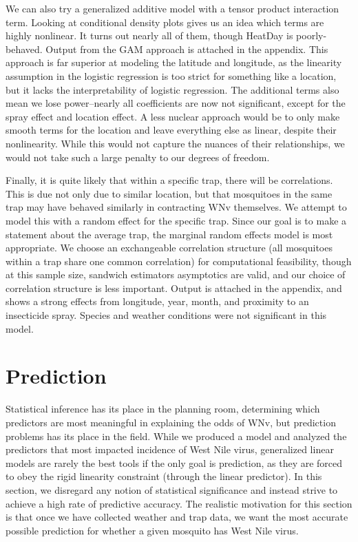 \documentclass[12pt]{article}
\begin{document}
We can also try a generalized additive model with a tensor product interaction term. Looking at conditional density plots gives us an idea which terms are highly nonlinear. It turns out nearly all of them, though HeatDay is poorly-behaved. Output from the GAM approach is attached in the appendix. This approach is far superior at modeling the latitude and longitude, as the linearity assumption in the logistic regression is too strict for something like a location, but it lacks the interpretability of logistic regression. The additional terms also mean we lose power--nearly all coefficients are now not significant, except for the spray effect and location effect. A less nuclear approach would be to only make smooth terms for the location and leave everything else as linear, despite their nonlinearity. While this would not capture the nuances of their relationships, we would not take such a large penalty to our degrees of freedom.

Finally, it is quite likely that within a specific trap, there will be correlations. This is due not only due to similar location, but that mosquitoes in the same trap may have behaved similarly in contracting WNv themselves. We attempt to model this with a random effect for the specific trap. Since our goal is to make a statement about the average trap, the marginal random effects model is most appropriate. We choose an exchangeable correlation structure (all mosquitoes within a trap share one common correlation) for computational feasibility, though at this sample size, sandwich estimators asymptotics are valid, and our choice of correlation structure is less important. Output is attached in the appendix, and shows a strong effects from longitude, year, month, and proximity to an insecticide spray. Species and weather conditions were not significant in this model.

\section{Prediction}
Statistical inference has its place in the planning room, determining which predictors are most meaningful in explaining the odds of WNv, but prediction problems has its place in the field. While we produced a model and analyzed the predictors that most impacted incidence of West Nile virus, generalized linear models are rarely the best tools if the only goal is prediction, as they are forced to obey the rigid linearity constraint (through the linear predictor). In this section, we disregard any notion of statistical significance and instead strive to achieve a high rate of predictive accuracy. The realistic motivation for this section is that once we have collected weather and trap data, we want the most accurate possible prediction for whether a given mosquito has West Nile virus.
\end{document}
